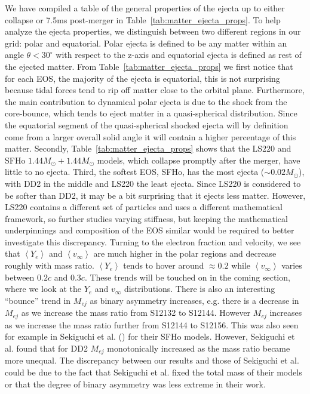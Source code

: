 We have compiled a table of the general properties of the ejecta up to either collapse or 7.5ms post-merger in Table~\ref{tab:matter_ejecta_props}. To help analyze the ejecta properties, we distinguish between two different regions in our grid: polar and equatorial.  Polar ejecta
is defined to be any matter within an angle $\theta < 30^\circ$ with respect to the z-axis and equatorial ejecta is defined as rest of the
ejected matter. From Table~\ref{tab:matter_ejecta_props} we first notice that for each EOS, the majority of the ejecta is equatorial, this is not surprising because tidal forces tend to rip off matter close to the orbital plane. Furthermore, the main contribution to dynamical polar ejecta is due to the shock from the core-bounce, which tends to eject matter in a quasi-spherical distribution. Since the equatorial segment of the quasi-spherical shocked ejecta will by definition come from a larger overall solid angle it will contain a higher percentage of this matter. Secondly, Table~\ref{tab:matter_ejecta_props} shows that the LS220 and SFHo $1.44M_\odot + 1.44M_\odot$ models, which collapse promptly after the merger, have little to no ejecta. Third, the softest EOS, SFHo, has the most ejecta ($\sim 0.02M_\odot$), with DD2 in the middle and LS220 the least ejecta. Since LS220 is considered to be softer than DD2, it may be a bit surprising that it ejects less matter. However, LS220 contains a different set of particles and uses a different mathematical framework, so further studies varying stiffness, but keeping the mathematical underpinnings and composition of the EOS similar would be required to better investigate this discrepancy. 
Turning to the electron fraction and velocity, we see that $\left<Y_e\right>$ and
$\left<v_\infty\right>$ are much higher in the polar regions and decrease roughly with mass ratio. $\left<Y_e\right>$ tends to hover around $\approx 0.2$ while $\left<v_\infty\right>$ varies between $0.2c$ and $0.3c$. These trends will be touched on in the coming section, where we look at the $Y_e$ and $v_\infty$ distributions. There is also an interesting ``bounce'' trend in $M_{ej}$ as binary asymmetry increases, e.g. there is a decrease in $M_{ej}$ as we increase the mass ratio from S12132 to S12144. However $M_{ej}$ increases as we increase the mass ratio further from S12144 to S12156. This was also seen for example in Sekiguchi et al. (\cite{sekiguchi2016dynamical}) for their SFHo models. However, Sekiguchi et al. found that for DD2 $M_{ej}$ monotonically increased as the mass ratio became more unequal. The discrepancy between our results and those of Sekiguchi et al. could be due to the fact that Sekiguchi et al. fixed the total mass of their models or that the degree of binary asymmetry was less extreme in their work.

